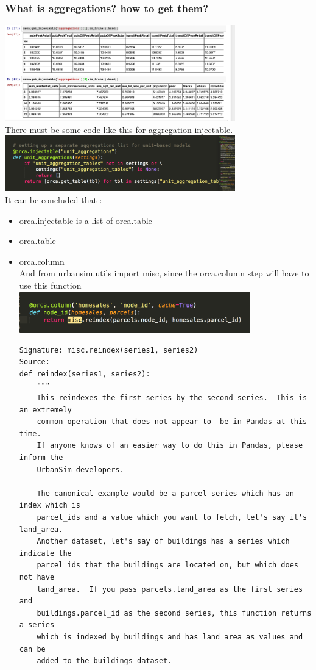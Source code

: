 \documentclass{article}\usepackage[]{graphicx}\usepackage[]{color}
\begin{document}
\begin{itemize}
\subsubsection{What is aggregations? how to get them?}
\includegraphics[width=10cm]{6.png}\\
There must be some code like this for aggregation injectable.\\
\includegraphics[width=10cm]{7.png}\\

It can be concluded that :
\begin{itemize}
\item{orca.injectable is a list of orca.table}
\item{orca.table}
\item{orca.column}\\
And from urbansim.utils import misc, since the orca.column step will have to use this function\\
\includegraphics[width=10cm]{8.png}\\

\begin{lstlisting}
Signature: misc.reindex(series1, series2)
Source:
def reindex(series1, series2):
    """
    This reindexes the first series by the second series.  This is an extremely
    common operation that does not appear to  be in Pandas at this time.
    If anyone knows of an easier way to do this in Pandas, please inform the
    UrbanSim developers.

    The canonical example would be a parcel series which has an index which is
    parcel_ids and a value which you want to fetch, let's say it's land_area.
    Another dataset, let's say of buildings has a series which indicate the
    parcel_ids that the buildings are located on, but which does not have
    land_area.  If you pass parcels.land_area as the first series and
    buildings.parcel_id as the second series, this function returns a series
    which is indexed by buildings and has land_area as values and can be
    added to the buildings dataset.


\end{lstlisting}
\end{itemize}
\end{itemize}
\end{document}
